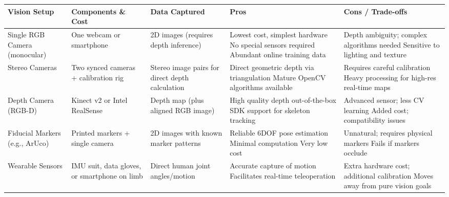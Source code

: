 \documentclass[document]{llncs}
\begin{document}
\begin{table}[H]
\hspace*{-0.5cm}
\label{tab:data_collection}
\begin{tabular}{|l|p{3cm}|p{3cm}|p{3cm}|p{3cm}|}
\hline
\textbf{Vision Setup} & \textbf{Components \& Cost} & \textbf{Data Captured} & \textbf{Pros} & \textbf{Cons / Trade-offs} \\
\hline
Single RGB Camera (monocular) &
One webcam or smartphone & 2D images (requires depth inference) &
  Lowest cost, simplest hardware
  No special sensors required
  Abundant online training data
& 
  Depth ambiguity; complex algorithms needed
  Sensitive to lighting and texture
\\
\hline
Stereo Cameras &
Two synced cameras + calibration rig &
Stereo image pairs for direct depth calculation &
  Direct geometric depth via triangulation
  Mature OpenCV algorithms available
& 
  Requires careful calibration
  Heavy processing for high-res real-time maps
\\
\hline
Depth Camera (RGB-D) &
Kinect v2 or Intel RealSense & Depth map (plus aligned RGB image) &
  High quality depth out-of-the-box
  SDK support for skeleton tracking
& 
  Advanced sensor; less CV learning
  Added cost; compatibility issues
\\
\hline
Fiducial Markers (e.g., ArUco) &
Printed markers + single camera & 2D images with known marker patterns &
  Reliable 6DOF pose estimation
  Minimal computation
  Very low cost
& 
  Unnatural; requires physical markers
  Fails if markers occlude
\\
\hline
Wearable Sensors &
IMU suit, data gloves, or smartphone on limb &
Direct human joint angles/motion &
  Accurate capture of motion
  Facilitates real-time teleoperation
& 

  Extra hardware cost; additional calibration
  Moves away from pure vision goals
\\
\hline
\end{tabular}
\end{table}



\end{document}
